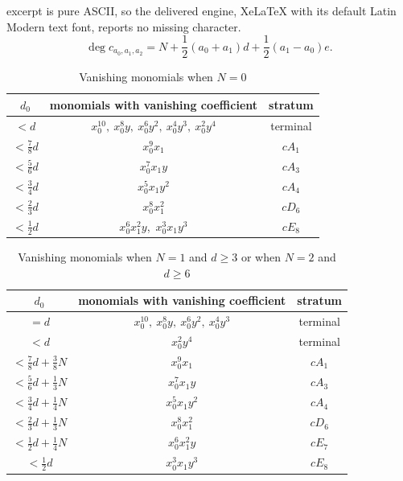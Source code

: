 \documentclass[10pt,a4paper]{amsart}
\begin{document}
excerpt is pure ASCII, so the delivered engine, XeLaTeX with its default Latin Modern text font, reports no missing character.
	\begin{equation} \label{eq: degree c}
		\deg c_{a_0, a_1, a_2} = N + \frac12 (a_0 + a_1) d + \frac 12 (a_1-a_0) e.
	\end{equation}

\begin{table}[ht]\caption{Vanishing monomials when $N = 0$} \label{tab: N=0}
	\begin{tabular}{ccc}
        \hline
		$d_0$ & monomials with vanishing coefficient & stratum\\
		\hline
		$<d$ & $x_0^{10},\ x_0^8y,\ x_0^6y^2,\ x_0^4y^3,\ x_0^2y^4$& terminal  \\
		$<\frac78d$ & $x_0^9x_1$ &$cA_1$\\
		$<\frac56d$ & $x_0^7x_1y$ &$cA_3$\\
		$<\frac34d$& $x_0^5x_1y^2$ &$cA_4$ \\
		$<\frac23d$ & $x_0^8x_1^2$ &$cD_6$\\
		$<\frac12d$& $x_0^6x_1^2y$,\ $x_0^3x_1y^3$ &$cE_8$ \\
	\end{tabular}
\end{table}

\begin{table}[ht] \caption{Vanishing monomials when $N = 1$ and $d \ge 3$ or when $N = 2$ and $d \ge 6$} \label{tab: N=1}
	\begin{tabular}{ccc}
        \hline
		$d_0$ & monomials with vanishing coefficient & stratum\\
		\hline
		$= d$ & $x_0^{10},\ x_0^8y,\ x_0^6y^2,\ x_0^4y^3$ & terminal \\
		$< d$ & $x_0^2y^4$ & terminal  \\
		$<\frac78d + \frac38N$ & $x_0^9x_1$ &$cA_1$\\
		$<\frac56d + \frac13N$ & $x_0^7x_1y$ &$cA_3$\\
		$<\frac34d + \frac14N$ & $x_0^5x_1y^2$ &$cA_4$ \\
		$<\frac23d + \frac13N$ & $x_0^8x_1^2$ &$cD_6$\\
		$<\frac12d + \frac14N$ & $x_0^6x_1^2y$ & $cE_7$ \\
		$<\frac12d$ & $x_0^3x_1y^3$ & $cE_8$ \\
	\end{tabular}
\end{table}
\end{document}
